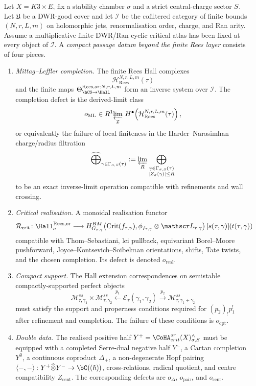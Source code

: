 \begin{definition}
\label{def:compact-oriented-critical-hall-datum}
Let $X=K3\times E$, fix a stability chamber $\sigma$ and a strict
central-charge sector $S$. Let $\mathfrak U$ be a DWR-good cover and
let $\mathcal I$ be the cofiltered category of finite bounds
$(N,r,L,m)$ on holomorphic jets, renormalisation order, charge, and
Ran arity. Assume a multiplicative finite DWR/Ran cyclic critical atlas
has been fixed at every object of $\mathcal I$. A
\emph{compact passage datum beyond the finite Rees layer} consists of
four pieces.
\begin{enumerate}[label=\emph{(\roman*)}, leftmargin=2.5em]
\item \emph{Mittag--Leffler completion.} The finite Rees Hall complexes
\[
 \mathcal H^{N,r,L,m}_{\mathrm{Rees}}(\tau)
\]
and the finite maps
$\Theta_{\hCS\to\Hall}^{\mathrm{Rees},\mathrm{or};N,r,L,m}$ form an
inverse system over $\mathcal I$. The completion defect is the
derived-limit class
\[
 o_{\mathrm{ML}}
 \in
 R^{1}\!\varprojlim_{\mathcal I}\,
 H^\bullet\!\left(
 \mathcal H^{N,r,L,m}_{\mathrm{Rees}}(\tau)
 \right),
\]
or equivalently the failure of local finiteness in the
Harder--Narasimhan charge/radius filtration
\[
 \widehat{\bigoplus}_{\gamma\in\Gamma_{\sigma,S}(\tau)}
 :=
 \varprojlim_R
 \bigoplus_{\substack{\gamma\in\Gamma_{\sigma,S}(\tau)\\
 |Z_\sigma(\gamma)|\leq R}}
\]
to be an exact inverse-limit operation compatible with refinements and
wall crossing.
\item \emph{Critical realisation.} A monoidal realisation functor
\[
 \mathcal R_{\mathrm{crit}}\colon
 \Hall_{\sigma}^{\mathrm{Rees},\mathrm{or}}
 \longrightarrow
 H^{BM}_{G_{\tau,\gamma}}\!
 \left(
 \operatorname{Crit}(f_{\tau,\gamma}),
 \phi_{f_{\tau,\gamma}}\otimes\mathscr L_{\tau,\gamma}
 \right)[s(\tau,\gamma)](t(\tau,\gamma))
\]
compatible with Thom--Sebastiani, lci pullback, equivariant
Borel--Moore pushforward, Joyce--Kontsevich--Soibelman orientations,
shifts, Tate twists, and the chosen completion. Its defect is denoted
$o_{\mathrm{real}}$.
\item \emph{Compact support.} The Hall extension correspondences on
semistable compactly-supported perfect objects
\[
 \mathcal M_{\tau,\gamma_1}^{ss}\times
 \mathcal M_{\tau,\gamma_2}^{ss}
 \xleftarrow{\ p_1\ }
 \mathcal E_\tau(\gamma_1,\gamma_2)
 \xrightarrow{\ p_2\ }
 \mathcal M_{\tau,\gamma_1+\gamma_2}^{ss}
\]
must satisfy the support and properness conditions required for
$(p_2)_!p_1^!$ after refinement and completion. The failure of these
conditions is $o_{\mathrm{cpt}}$.
\item \emph{Double data.} The realised positive half
$Y^+=\CoHA^{or}_{crit}(X)_{\sigma,S}^{\wedge}$ must be equipped with a
completed Serre-dual negative half $Y^-$, a Cartan completion $Y^0$, a
continuous coproduct $\Delta_+$, a non-degenerate Hopf pairing
$\langle-,-\rangle:Y^+\widehat\otimes Y^-\to\bC((\hbar))$,
cross-relations, radical quotient, and centre compatibility
$Z_{\mathrm{cent}}$. The corresponding defects are
$o_\Delta$, $o_{\mathrm{pair}}$, and $o_{\mathrm{cent}}$.
\end{enumerate}
\end{definition}


